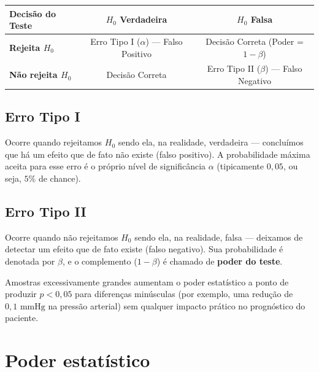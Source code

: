 \begin{center}
\label{tab:erros_decisao}

\vspace{2mm}

\begin{tabular}{l c c}
\toprule
\textbf{Decisão do Teste} & \textbf{$H_0$ Verdadeira} & \textbf{$H_0$ Falsa} \\
\midrule
\textbf{Rejeita $H_0$} &
Erro Tipo I ($\alpha$) --- Falso Positivo &
Decisão Correta (Poder = $1-\beta$) \\

\textbf{Não rejeita $H_0$} &
Decisão Correta &
Erro Tipo II ($\beta$) --- Falso Negativo \\
\bottomrule
\end{tabular}
\end{center}

\subsection{Erro Tipo I}
Ocorre quando rejeitamos $H_0$ sendo ela, na realidade, verdadeira --- concluímos que há um efeito que de fato não existe (falso positivo). A probabilidade máxima aceita para esse erro é o próprio nível de significância $\alpha$ (tipicamente $0{,}05$, ou seja, $5\%$ de chance).

\subsection{Erro Tipo II}
Ocorre quando não rejeitamos $H_0$ sendo ela, na realidade, falsa --- deixamos de detectar um efeito que de fato existe (falso negativo). Sua probabilidade é denotada por $\beta$, e o complemento ($1-\beta$) é chamado de \textbf{poder do teste}.
\begin{error}

Amostras excessivamente grandes aumentam o poder estatístico a ponto de produzir $p < 0{,}05$ para diferenças minúsculas (por exemplo, uma redução de $0{,}1\text{ mmHg}$ na pressão arterial) sem qualquer impacto prático no prognóstico do paciente.
\end{error}

\section{Poder estatístico}

